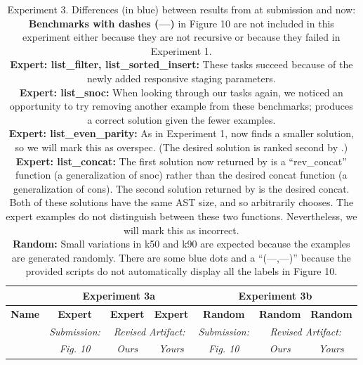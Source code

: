 \begin{table}

\experimentTableSize

\begin{tabular}{l|cccccc}
& \multicolumn{3}{c}{\textbf{Experiment 3a}}
& \multicolumn{3}{c}{\textbf{Experiment 3b}} \\\hline
\textbf{Name} &
\textbf{Expert} & \textbf{Expert} & \textbf{Expert} &
\textbf{Random} & \textbf{Random} & \textbf{Random} \\
&
\textit{Submission:} & \multicolumn{2}{c}{\textit{Revised Artifact:}} &
\textit{Submission:} & \multicolumn{2}{c}{\textit{Revised Artifact:}} \\
&
\textit{Fig. 10} & \textit{Ours} & \textit{Yours} &
\textit{Fig. 10} & \textit{Ours} & \textit{Yours} \\

\end{tabular}

\vspace{0.10in}

\caption{Experiment 3.
%
Differences (in blue) between results from \snsMyth{} at submission and
\snsMyth{} now:
%
\experimentCaptionSize
%
\\[3pt]
%
\textbf{Benchmarks with dashes ({---})} in Figure 10 are not included in this
experiment either because they are not recursive or because they failed in
Experiment 1.
%
\\[3pt]
%
\textbf{Expert: list\_filter, list\_sorted\_insert:} These tasks succeed because
of the newly added responsive staging parameters.
%
\\[3pt]
%
\textbf{Expert: list\_snoc:} When looking through our tasks again, we noticed an
opportunity to try removing another example from these benchmarks; \snsMyth{}
produces a correct solution given the fewer examples.
%
\\[3pt]
%
\textbf{Expert: list\_even\_parity:} As in Experiment 1, \snsMyth{} now finds a
smaller solution, so we will mark this as {\scriptsize{overspec}}. (The desired
solution is ranked second by \snsMyth{}.)
%
%
%
\\[3pt]
%
\textbf{Expert: list\_concat:} The first solution now returned by \snsMyth{} is
a ``rev\_concat'' function (a generalization of snoc) rather than the desired
concat function (a generalization of cons). The second solution returned by
\snsMyth{} is the desired concat. Both of these solutions have the same AST
size, and so \snsMyth{} arbitrarily chooses. The \myth{} expert examples do not
distinguish between these two functions. Nevertheless, we will mark this as
{\scriptsize{incorrect}}.
%
\\[3pt]
%
\textbf{Random:} Small variations in k50 and k90 are expected because the
examples are generated randomly. There are some blue dots and a ``(---,---)''
because the provided scripts do not automatically display all the labels in
Figure 10.
%
}

\end{table}
